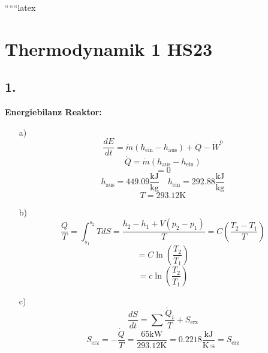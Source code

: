 
``````latex


\section*{Thermodynamik 1 HS23}

\subsection*{1.}
\textbf{Energiebilanz Reaktor:}

\begin{itemize}
    \item[a)] 
    \begin{equation}
    \frac{dE}{dt} = \dot{m} (h_{\text{ein}} - h_{\text{aus}}) + \dot{Q} - \dot{W}^{\text{o}}
    \end{equation}
    \begin{equation}
    \dot{Q} = \dot{m} (h_{\text{aus}} - h_{\text{ein}})
    \end{equation}
    \begin{equation}
    = 0
    \end{equation}
    \begin{equation}
    h_{\text{aus}} = 449.09 \frac{\text{kJ}}{\text{kg}} \quad h_{\text{ein}} = 292.88 \frac{\text{kJ}}{\text{kg}}
    \end{equation}
    \begin{equation}
    T = 293.12 \text{K}
    \end{equation}
    
    \item[b)] 
    \begin{equation}
    \frac{Q}{T} = \int_{s_1}^{s_2} T dS = \frac{h_2 - h_1 + V(p_2 - p_1)}{T} = C \left( \frac{T_2 - T_1}{T} \right)
    \end{equation}
    \begin{equation}
    = C \ln \left( \frac{T_2}{T_1} \right)
    \end{equation}
    \begin{equation}
    = c \ln \left( \frac{T_2}{T_1} \right)
    \end{equation}
    
    \item[c)] 
    \begin{equation}
    \frac{dS}{dt} = \sum \frac{\dot{Q}_i}{T} + S_{\text{erz}}
    \end{equation}
    \begin{equation}
    S_{\text{erz}} = - \frac{\dot{Q}}{T} = \frac{65 \text{kW}}{293.12 \text{K}} = 0.2218 \frac{\text{kJ}}{\text{K} \cdot \text{s}} = S_{\text{erz}}
    \end{equation}
    

\end{itemize}
